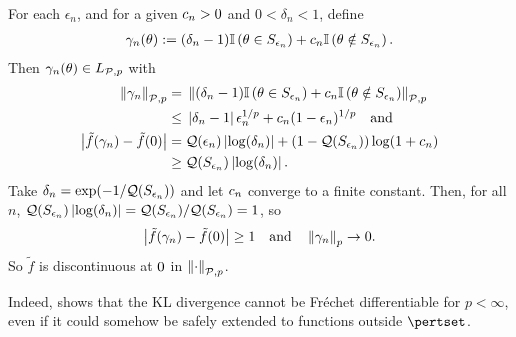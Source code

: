 \begin{ex}
For each $\epsilon_n$, and for a given $c_n > 0$ and $0 < \delta_n < 1$, define
%
\begin{align*}
%
\gamma_n(\theta) :=
(\delta_n - 1)\ind{\theta \in S_{\epsilon_n}} +
\c_n \ind{\theta \notin S_{\epsilon_n}}.
%
\end{align*}
%
Then $\gamma_n(\theta) \in {L_{\mathcal{P},p}}$ with
%
\begin{align*}
%
\norm{\gamma_n}_{\p,p} ={}&
\norm{(\delta_n - 1) \ind{\theta \in S_{\epsilon_n}} +
      \c_n \ind{\theta \notin S_{\epsilon_n}}}_{\p,p}
\\\le{}&
    \abs{\delta_n - 1} \epsilon_n^{1/p} +
    \c_n ( 1 - \epsilon_n)^{1/p}
\mathand\\
%
\abs{\tilde{f}(\gamma_n) - \tilde{f}(\phiz)}
={}&
    \q(\epsilon_n) \abs{\log(\delta_n)} +
    (1 - \q(S_{\epsilon_n})) \log(1 + \c_n)
\\\ge{}&
    \q(S_{\epsilon_n}) \abs{\log(\delta_n)}.
%
\end{align*}
Take $\delta_n = \exp(-1 / \mathcal{Q}(S_{\epsilon_n}))$ and let $c_n$ converge to a
finite constant.  Then, for all $n$, $\mathcal{Q}(S_{\epsilon_n}) \left|\log(\delta_n)\right|
= \mathcal{Q}(S_{\epsilon_n}) / \mathcal{Q}(S_{\epsilon_n}) = 1$, so
%
\begin{align*}
%
\abs{\tilde{f}(\gamma_n) - \tilde{f}(\phiz)} \ge{} 1
\mathtxt{and}
\norm{\gamma_n}_p \rightarrow{} 0.
%
\end{align*}
%
So $\tilde{f}$ is discontinuous at $0$ in $\left\Vert\cdot\right\Vert_{\mathcal{P}, p}$.
%
\end{ex}

Indeed,  shows that the KL divergence cannot be
Fr{\'e}chet differentiable for $p < \infty$, even if it could somehow be safely
extended to functions outside $\pertset$.

